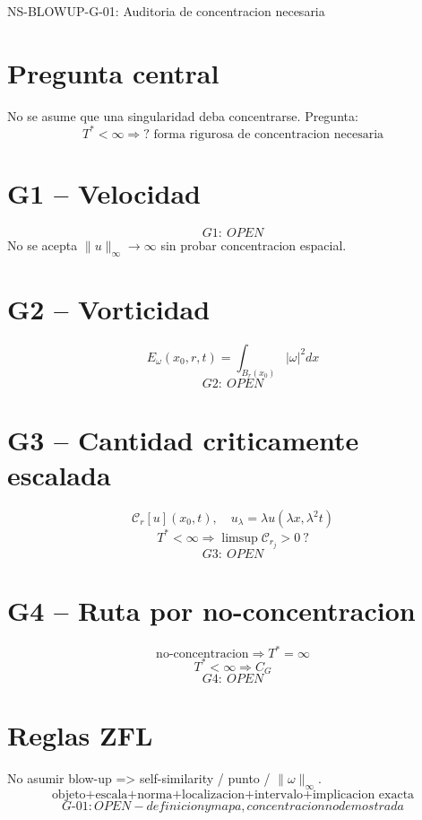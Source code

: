 \documentclass{article}
\begin{document}
\begin{center}
{\Large NS-BLOWUP-G-01: Auditoria de concentracion necesaria}
\end{center}
\section*{Pregunta central}
No se asume que una singularidad deba concentrarse. Pregunta:
\[
\boxed{T^*<\infty\Rightarrow\text{? forma rigurosa de concentracion necesaria}}
\]
\section*{G1 -- Velocidad}
\[
\boxed{G1:\ OPEN}
\]
No se acepta $\|u\|_\infty\to\infty$ sin probar concentracion espacial.
\section*{G2 -- Vorticidad}
\[
E_\omega(x_0,r,t)=\int_{B_r(x_0)}|\omega|^2 dx
\]
\[
\boxed{G2:\ OPEN}
\]
\section*{G3 -- Cantidad criticamente escalada}
\[
\mathcal C_r[u](x_0,t),\quad u_\lambda=\lambda u(\lambda x,\lambda^2 t)
\]
\[
\boxed{T^*<\infty\Rightarrow\limsup \mathcal C_{r_j}>0\ ?}
\]
\[
\boxed{G3:\ OPEN}
\]
\section*{G4 -- Ruta por no-concentracion}
\[
\boxed{\text{no-concentracion}\Rightarrow T^*=\infty}
\]
\[
\boxed{T^*<\infty\Rightarrow C_G}
\]
\[
\boxed{G4:\ OPEN}
\]
\section*{Reglas ZFL}
No asumir blow-up => self-similarity / punto / $\|\omega\|_\infty$.
\[
\boxed{\text{objeto+escala+norma+localizacion+intervalo+implicacion exacta}}
\]
\[
\boxed{G\text{-}01: OPEN - definicion y mapa, concentracion no demostrada}
\]
\end{document}
